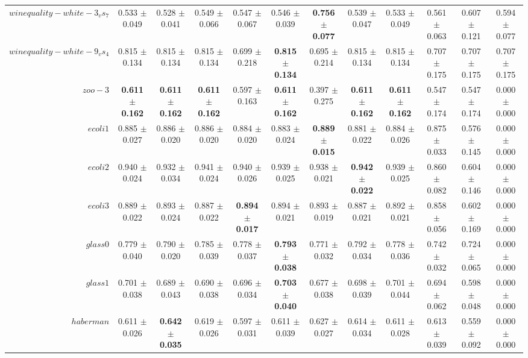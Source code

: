 \begin{table}[!ht]
{\begin{tabular}{r c c c c c c c c c c c}
$winequality-white-3_vs_7$ & 0.533 $\pm$ 0.049 & 0.528 $\pm$ 0.041 & 0.549 $\pm$ 0.066 & 0.547 $\pm$ 0.067 & 0.546 $\pm$ 0.039 & \textbf{0.756 $\pm$ 0.077} & 0.539 $\pm$ 0.047 & 0.533 $\pm$ 0.049 & 0.561 $\pm$ 0.063 & 0.607 $\pm$ 0.121 & 0.594 $\pm$ 0.077 \\
$winequality-white-9_vs_4$ & 0.815 $\pm$ 0.134 & 0.815 $\pm$ 0.134 & 0.815 $\pm$ 0.134 & 0.699 $\pm$ 0.218 & \textbf{0.815 $\pm$ 0.134} & 0.695 $\pm$ 0.214 & 0.815 $\pm$ 0.134 & 0.815 $\pm$ 0.134 & 0.707 $\pm$ 0.175 & 0.707 $\pm$ 0.175 & 0.707 $\pm$ 0.175 \\
$zoo-3$ & \textbf{0.611 $\pm$ 0.162} & \textbf{0.611 $\pm$ 0.162} & \textbf{0.611 $\pm$ 0.162} & 0.597 $\pm$ 0.163 & \textbf{0.611 $\pm$ 0.162} & 0.397 $\pm$ 0.275 & \textbf{0.611 $\pm$ 0.162} & \textbf{0.611 $\pm$ 0.162} & 0.547 $\pm$ 0.174 & 0.547 $\pm$ 0.174 & 0.000 $\pm$ 0.000 \\
$ecoli1$ & 0.885 $\pm$ 0.027 & 0.886 $\pm$ 0.020 & 0.886 $\pm$ 0.020 & 0.884 $\pm$ 0.020 & 0.883 $\pm$ 0.024 & \textbf{0.889 $\pm$ 0.015} & 0.881 $\pm$ 0.022 & 0.884 $\pm$ 0.026 & 0.875 $\pm$ 0.033 & 0.576 $\pm$ 0.145 & 0.000 $\pm$ 0.000 \\
$ecoli2$ & 0.940 $\pm$ 0.024 & 0.932 $\pm$ 0.034 & 0.941 $\pm$ 0.024 & 0.940 $\pm$ 0.026 & 0.939 $\pm$ 0.025 & 0.938 $\pm$ 0.021 & \textbf{0.942 $\pm$ 0.022} & 0.939 $\pm$ 0.025 & 0.860 $\pm$ 0.082 & 0.604 $\pm$ 0.146 & 0.000 $\pm$ 0.000 \\
$ecoli3$ & 0.889 $\pm$ 0.022 & 0.893 $\pm$ 0.024 & 0.887 $\pm$ 0.022 & \textbf{0.894 $\pm$ 0.017} & 0.894 $\pm$ 0.021 & 0.893 $\pm$ 0.019 & 0.887 $\pm$ 0.021 & 0.892 $\pm$ 0.021 & 0.858 $\pm$ 0.056 & 0.602 $\pm$ 0.169 & 0.000 $\pm$ 0.000 \\
$glass0$ & 0.779 $\pm$ 0.040 & 0.790 $\pm$ 0.020 & 0.785 $\pm$ 0.039 & 0.778 $\pm$ 0.037 & \textbf{0.793 $\pm$ 0.038} & 0.771 $\pm$ 0.032 & 0.792 $\pm$ 0.034 & 0.778 $\pm$ 0.036 & 0.742 $\pm$ 0.032 & 0.724 $\pm$ 0.065 & 0.000 $\pm$ 0.000 \\
$glass1$ & 0.701 $\pm$ 0.038 & 0.689 $\pm$ 0.043 & 0.690 $\pm$ 0.038 & 0.696 $\pm$ 0.034 & \textbf{0.703 $\pm$ 0.040} & 0.677 $\pm$ 0.038 & 0.698 $\pm$ 0.039 & 0.701 $\pm$ 0.044 & 0.694 $\pm$ 0.062 & 0.598 $\pm$ 0.048 & 0.000 $\pm$ 0.000 \\
$haberman$ & 0.611 $\pm$ 0.026 & \textbf{0.642 $\pm$ 0.035} & 0.619 $\pm$ 0.026 & 0.597 $\pm$ 0.031 & 0.611 $\pm$ 0.039 & 0.627 $\pm$ 0.027 & 0.614 $\pm$ 0.034 & 0.611 $\pm$ 0.028 & 0.613 $\pm$ 0.039 & 0.559 $\pm$ 0.092 & 0.000 $\pm$ 0.000 \\

\end{tabular}}
\end{table}
